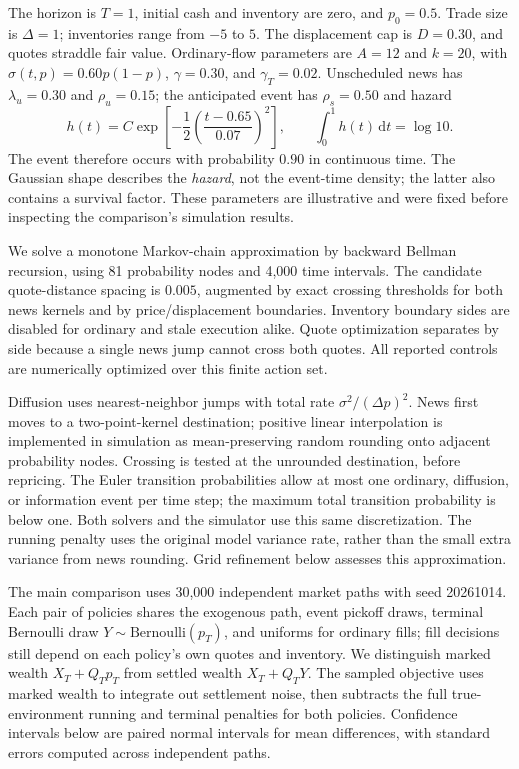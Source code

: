 \documentclass[11pt]{article}
\newcommand{\1}{\mathbf 1}
\newcommand{\dd}{\mathrm d}
\begin{document}
The horizon is $T=1$, initial cash and inventory are zero, and $p_0=0.5$.
Trade size is $\Delta=1$; inventories range from $-5$ to $5$. The displacement
cap is $D=0.30$, and quotes straddle fair value. Ordinary-flow parameters are
$A=12$ and $k=20$, with $\sigma(t,p)=0.60p(1-p)$, $\gamma=0.30$, and
$\gamma_T=0.02$. Unscheduled news has $\lambda_u=0.30$ and $\rho_u=0.15$;
the anticipated event has $\rho_s=0.50$ and hazard
\begin{equation}
 h(t)=C\exp\!\left[-\frac12\left(\frac{t-0.65}{0.07}\right)^2\right],
 \qquad \int_0^1 h(t)\,\dd t=\log 10.
\end{equation}
The event therefore occurs with probability $0.90$ in continuous time. The
Gaussian shape describes the \emph{hazard}, not the event-time density; the
latter also contains a survival factor. These parameters are illustrative and
were fixed before inspecting the comparison's simulation results.

We solve a monotone Markov-chain approximation by backward Bellman recursion,
using 81 probability nodes and 4,000 time intervals. The candidate quote-distance
spacing is $0.005$, augmented by exact crossing thresholds for both news kernels
and by price/displacement boundaries. Inventory boundary sides are disabled
for ordinary and stale execution alike. Quote optimization separates by side
because a single news jump cannot cross both quotes. All reported controls are
numerically optimized over this finite action set.

Diffusion uses nearest-neighbor jumps with total rate
$\sigma^2/(\Delta p)^2$. News first moves to a two-point-kernel destination;
positive linear interpolation is implemented in simulation as mean-preserving
random rounding onto adjacent probability nodes. Crossing is tested at the
unrounded destination, before repricing. The Euler transition probabilities
allow at most one ordinary, diffusion, or information event per time step;
the maximum total transition probability is below one. Both solvers and the
simulator use this same discretization. The running penalty uses the original
model variance rate, rather than the small extra variance from news rounding.
Grid refinement below assesses this approximation.

The main comparison uses 30,000 independent market paths with seed 20261014.
Each pair of policies shares the exogenous path, event pickoff draws, terminal
Bernoulli draw $Y\sim\mathrm{Bernoulli}(p_T)$, and uniforms for ordinary fills;
fill decisions still depend on each policy's own quotes and inventory.
We distinguish marked wealth $X_T+Q_Tp_T$ from settled wealth $X_T+Q_TY$.
The sampled objective uses marked wealth to integrate out settlement noise,
then subtracts the full true-environment running and terminal penalties for
both policies. Confidence intervals below are paired normal intervals for mean
differences, with standard errors computed across independent paths.
\end{document}
